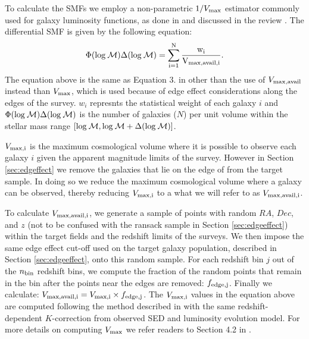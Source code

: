 \documentclass{emulateapj}
\begin{document}
To calculate the SMFs we employ a non-parametric $1/{V_{\rm{max}}}$ estimator commonly used for galaxy luminosity functions, as done in \cite{Moustakas:2013aa} and discussed 
in the review \cite{Johnston:2011aa}. 
The differential SMF is given by the following equation:
\begin{equation} \label{eq:phi}
\Phi(\rm{log}\: \mathcal{M}) \Delta(\rm{log} \:\mathcal{M}) = \sum\limits_{i=1}^{N} \frac{w_i}{V_{\rm{max,avail},i}}. 
\end{equation}
The equation above is the same as Equation 3. in \cite{Moustakas:2013aa} other than the use of $V_{\rm{max,avail}}$ instead than $V_{\rm{max}}$, which is used because of edge effect 
considerations along the edges of the survey. 
$w_i$ represnts the statistical weight of each galaxy $i$ and $\Phi(\rm{log}\: \mathcal{M}) \Delta(\rm{log}\: \mathcal{M})$ is the number of galaxies ($N$) per unit volume within the 
stellar mass range $[\rm{log} \:\mathcal{M}, \rm{log} \:\mathcal{M}+\Delta(\rm{log} \:\mathcal{M})]$.

$V_{\rm{max},i}$ is the maximum cosmological volume where it is possible to observe each galaxy $i$ given the apparent magnitude limits of the survey.
However in Section \ref{sec:edgeffect} we remove the galaxies that lie on the edge of from the target sample. 
In doing so we reduce the maximum cosmological volume where a galaxy can be observed, thereby reducing $V_{\rm{max},i}$ to a what we will refer to as $V_{\rm{max,avail},i}$.

To calculate $V_{\rm{max,avail},i}$, we generate a sample of points with random $RA$, $Dec$, and $z$ (not to be confused with the ransack sample in Section \ref{sec:edgeeffect}) 
within the target fields and the redshift limits of the surveys.
We then impose the same edge effect cut-off used on the target galaxy population, described in Section \ref{sec:edgeeffect}, onto this random sample. 
For each redshift bin $j$ out of the $n_{\rm{bin}}$ redshift bins, we compute the fraction of the random points that remain in the bin after the points near the edges are removed: 
$f_{\rm{edge},j}$.
Finally we calculate: $V_{\rm{max,avail},i} = V_{\rm{max},i} \times f_{\rm{edge},j}$. 
The $V_{\rm{max},i}$ values in the equation above are computed following the method described in \cite{Moustakas:2013aa} with the same redshift-dependent $K$-correction 
from observed SED and luminosity evolution model.
For more details on computing $V_{\rm{max}}$ we refer readers to Section 4.2 in \cite{Moustakas:2013aa}. 
\end{document}
